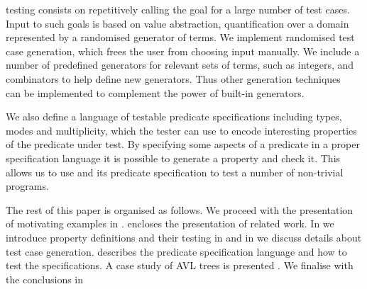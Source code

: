 \plqc{} testing consists on repetitively calling the goal for a large number of
test cases.
%
Input to such goals is based on \plqc{} value abstraction,
quantification over a domain represented by a randomised generator of
terms.
%
We implement randomised test case generation, which frees the user
from choosing input manually.
%
We include a number of predefined generators for relevant sets of
terms, such as integers, and combinators to help define new
generators.
%
Thus other generation techniques
\cite{Duregard-2012-feat}~\cite{naylor2007logic}~\cite{runciman2008smallcheck} can be
implemented  to complement the power of built-in generators.



We also define a language of testable predicate specifications including
types, modes and multiplicity, which the tester can use to encode
interesting properties of the predicate under test.
%
By specifying some aspects of a predicate in a proper specification
language it is possible to generate a \plqc{} property and check it.
%
This allows us to  use \plqc{} and its predicate specification to test a
number of non-trivial programs.




The rest of this paper is organised as follows.
%
We proceed with the presentation of motivating examples in
. 
%
 encloses the presentation of related work.
%
In  we introduce property definitions and their
testing in \plqc{} and in  we discuss details
about test case generation.
%
 describes the predicate specification language
and how to test the specifications.
%
A case study of AVL trees is presented . 
%
We finalise with the conclusions in 


